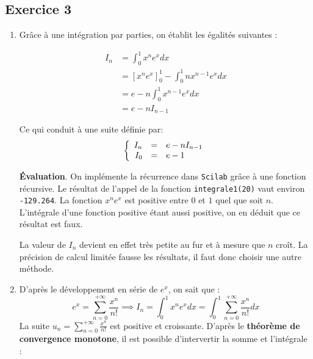 \documentclass[a4paper,11pt]{article}
\theoremstyle{nonumberplain}
\theoremstyle{nonumberplain}
\theoremstyle{nonumberplain}
\begin{document}
\subsection*{Exercice 3}

    \begin{enumerate}
        \setlength\itemsep{2em}
        \item
        Grâce à une intégration par parties, on établit les égalités suivantes :

        \begin{equation*}
        \begin{split}
            I_{n}   & = \int_{0}^{1} x^{n}e^{x} dx \\
                    & = [x^{n}e^{x}]_{0}^{1} - \int_{0}^{1} n x^{n-1}e^{x} dx \\
                    & = e - n\int_{0}^{1} x^{n-1}e^{x} dx \\
                    & = e - n I_{n-1}
        \end{split}
        \end{equation*}

        Ce qui conduit à une suite définie par:
        \[
        \left\{
        \begin{array}{r c l}
            I_{n} &=& e - n I_{n-1}\\
            I_{0} &=& e - 1
        \end{array}
        \right.
        \]

        \textbf{\'{E}valuation}. On implémente la récurrence dans \texttt{Scilab} grâce à une fonction récursive.
        Le résultat de l'appel de la fonction \texttt{integrale1(20)} vaut environ \texttt{-129.264}.
        La fonction $x^{n}e^{x}$ est positive entre $0$ et $1$ quel que soit $n$.
        L'intégrale d'une fonction positive étant aussi positive, on en déduit que ce résultat est faux.

        La valeur de $I_{n}$ devient en effet très petite au fur et à mesure que $n$ croît.
        La précision de calcul limitée fausse les résultats, il faut donc choisir une autre méthode.

        \item
        D'après le développement en série de $e^{x}$, on sait que :
        $$e^{x} =  \sum\limits_{n = 0}^{+\infty} \frac{x^{n}}{n!} \implies I_{n} = \int_{0}^{1} x^{n}e^{x} dx = \int_{0}^{1}\sum\limits_{n = 0}^{+\infty} \frac{x^{n}}{n!} dx$$
        La suite $u_{n} = \sum\limits_{n = 0}^{+\infty} \frac{x^{n}}{n!}$ est positive et croissante. D'après le \textbf{théorème
        de convergence monotone}, il est possible d'intervertir la somme et l'intégrale :


\end{enumerate}
\end{document}
